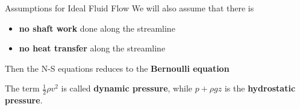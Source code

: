 \documentclass[12pt,aspectratio=169]{beamer}
\begin{document}
\begin{frame}{Assumptions for Ideal Fluid Flow}
  We will also assume that there is
  \begin{itemize}
  \item\textbf{no shaft work} done along the streamline
  \item\textbf{no heat transfer} along the streamline
  \end{itemize}
  Then the N-S equations reduces to the \textbf{Bernoulli equation}
  
  
  The term $\displaystyle\frac{1}{2}\rho v^2$ is called \textbf{dynamic
    pressure}, while $p+\rho gz$ is the \textbf{hydrostatic pressure}.
\end{frame}
\end{document}
